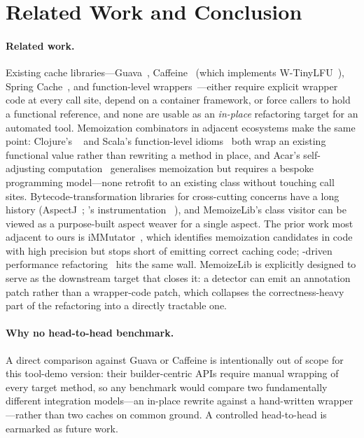 \section{Related Work and Conclusion}\label{sec:relatedconclusions}

\paragraph{Related work.}
Existing \jvm cache libraries---Guava~\cite{guava}, Caffeine~\cite{caffeine} (which implements W-TinyLFU~\cite{einziger2017tinylfu}), Spring Cache~\cite{spring_cache}, and function-level wrappers~\cite{javamemoization}---either require explicit wrapper code at every call site, depend on a container framework, or force callers to hold a functional reference, and none are usable as an \emph{in-place} refactoring target for an automated tool. Memoization combinators in adjacent ecosystems make the same point: Clojure's ~\cite{clojure_core_memoize} and Scala's function-level idioms~\cite{scala_memo} both wrap an existing functional value rather than rewriting a method in place, and Acar's self-adjusting computation~\cite{acar_sac} generalises memoization but requires a bespoke programming model---none retrofit to an existing \jvm class without touching call sites. Bytecode-transformation libraries for cross-cutting concerns have a long history (AspectJ~\cite{aspectj}; \agp's instrumentation \api~\cite{agp_instrumentation}), and MemoizeLib's class visitor can be viewed as a purpose-built aspect weaver for a single aspect. The prior work most adjacent to ours is iMMutator~\cite{immutator}, which identifies memoization candidates in \jvm code with high precision but stops short of emitting correct caching code; \llm-driven performance refactoring~\cite{llm_refactoring,hall_costa} hits the same wall. MemoizeLib is explicitly designed to serve as the downstream target that closes it: a detector can emit an annotation patch rather than a wrapper-code patch, which collapses the correctness-heavy part of the refactoring into a directly tractable one.

\paragraph{Why no head-to-head benchmark.} A direct comparison against Guava or Caffeine is intentionally out of scope for this tool-demo version: their builder-centric APIs require manual wrapping of every target method, so any benchmark would compare two fundamentally different integration models---an in-place rewrite against a hand-written wrapper---rather than two caches on common ground. A controlled head-to-head is earmarked as future work.


